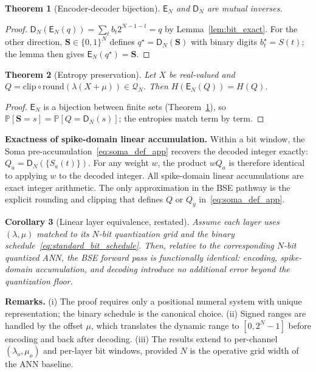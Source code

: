 \documentclass{article}
\theoremstyle{plain}
\newtheorem{theorem}{Theorem}[section]
\newtheorem{corollary}[theorem]{Corollary}
\theoremstyle{definition}
\theoremstyle{remark}
\begin{document}
\begin{theorem}[Encoder-decoder bijection]
\label{thm:bijective}
$\mathsf{E}_N$ and $\mathsf{D}_N$ are mutual inverses.
\end{theorem}

\begin{proof}
$\mathsf{D}_N(\mathsf{E}_N(q)) = \sum_t b_t 2^{N-1-t} = q$ by
Lemma~\ref{lem:bit_exact}. For the other direction, $\mathbf{S}\in\{0,1\}^N$
defines $q^\star = \mathsf{D}_N(\mathbf{S})$ with binary digits
$b_t^\star = S(t)$; the lemma then gives $\mathsf{E}_N(q^\star) = \mathbf{S}$.
\end{proof}

\begin{theorem}[Entropy preservation]
\label{thm:entropy_preservation}
Let $X$ be real-valued and $Q = \mathrm{clip}\circ\mathrm{round}(\lambda(X+\mu))
\in\mathcal{Q}_N$. Then $H(\mathsf{E}_N(Q)) = H(Q)$.
\end{theorem}

\begin{proof}
$\mathsf{E}_N$ is a bijection between finite sets (Theorem~\ref{thm:bijective}),
so $\mathbb{P}[\mathbf{S}=s] = \mathbb{P}[Q=\mathsf{D}_N(s)]$; the entropies
match term by term.
\end{proof}

\noindent\textbf{Exactness of spike-domain linear accumulation.}
Within a bit window, the Soma pre-accumulation~\eqref{eq:soma_def_app}
recovers the decoded integer exactly:
$Q_a = \mathsf{D}_N(\{S_a(t)\})$. For any weight $w$, the product $wQ_a$ is
therefore identical to applying $w$ to the decoded integer. All spike-domain
linear accumulations are exact integer arithmetic. The only approximation in
the BSE pathway is the explicit rounding and clipping that defines $Q$ or
$Q_y$ in~\eqref{eq:soma_def_app}.

\begin{corollary}[Linear layer equivalence, restated]
\label{cor:no_diffusion}
Assume each layer uses $(\lambda,\mu)$ matched to its $N$-bit quantization
grid and the binary schedule~\eqref{eq:standard_bit_schedule}. Then, relative
to the corresponding $N$-bit quantized ANN, the BSE forward pass is
functionally identical: encoding, spike-domain accumulation, and decoding
introduce no additional error beyond the quantization floor.
\end{corollary}

\noindent\textbf{Remarks.}
(i) The proof requires only a positional numeral system with unique
representation; the binary schedule is the canonical choice.
(ii) Signed ranges are handled by the offset $\mu$, which translates the
dynamic range to $[0, 2^N-1]$ before encoding and back after decoding.
(iii) The results extend to per-channel $(\lambda_o, \mu_o)$ and per-layer
bit windows, provided $N$ is the operative grid width of the ANN baseline.
\end{document}
